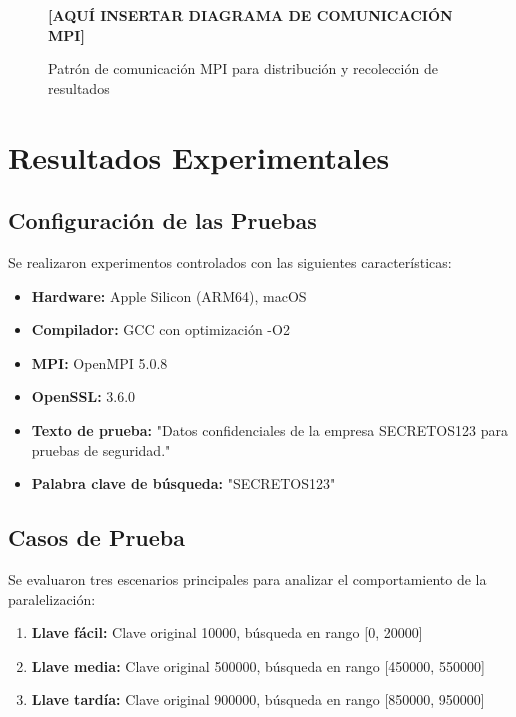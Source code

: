 \documentclass[12pt,letterpaper]{article}
\begin{document}
\begin{figure}[H]
\centering

\vspace{4cm} %

\textbf{[AQUÍ INSERTAR DIAGRAMA DE COMUNICACIÓN MPI]}

\caption{Patrón de comunicación MPI para distribución y recolección de resultados}
\label{fig:mpi-comm}
\end{figure}

\section{Resultados Experimentales}

\subsection{Configuración de las Pruebas}

Se realizaron experimentos controlados con las siguientes características:

\begin{itemize}
    \item \textbf{Hardware:} Apple Silicon (ARM64), macOS
    \item \textbf{Compilador:} GCC con optimización -O2
    \item \textbf{MPI:} OpenMPI 5.0.8
    \item \textbf{OpenSSL:} 3.6.0
    \item \textbf{Texto de prueba:} "Datos confidenciales de la empresa SECRETOS123 para pruebas de seguridad."
    \item \textbf{Palabra clave de búsqueda:} "SECRETOS123"
\end{itemize}

\subsection{Casos de Prueba}

Se evaluaron tres escenarios principales para analizar el comportamiento de la paralelización:

\begin{enumerate}
    \item \textbf{Llave fácil:} Clave original 10000, búsqueda en rango [0, 20000]
    \item \textbf{Llave media:} Clave original 500000, búsqueda en rango [450000, 550000]
    \item \textbf{Llave tardía:} Clave original 900000, búsqueda en rango [850000, 950000]
\end{enumerate}
\end{document}
